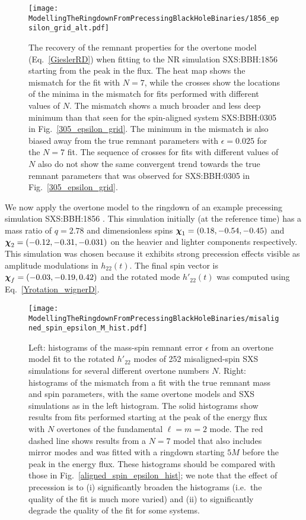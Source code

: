 \begin{figure}[t]
    \centering
    \texttt{[image: ModellingTheRingdownFromPrecessingBlackHoleBinaries/1856\_epsilon\_grid\_alt.pdf]}
    \caption[Recovery of the SXS:BBH:1856 remnant properties using an overtone model starting from the peak of the GW energy flux]{
    The recovery of the remnant properties for the overtone model (Eq.~\ref{GieslerRD}) when fitting to the NR simulation SXS:BBH:1856 starting from the peak in the flux.
    The heat map shows the mismatch for the fit with $N=7$, while the crosses show the locations of the minima in the mismatch for fits performed with different values of $N$.
    The mismatch shows a much broader and less deep minimum than that seen for the spin-aligned system SXS:BBH:0305 in Fig.~\ref{305_epsilon_grid}.
    The minimum in the mismatch is also biased away from the true remnant parameters with $\epsilon=0.025$ for the $N=7$ fit.
    The sequence of crosses for fits with different values of $N$ also do not show the same convergent trend towards the true remnant parameters that was observed for SXS:BBH:0305 in Fig.~\ref{305_epsilon_grid}.
	}
	\label{1856_epsilon_grid}
\end{figure}

We now apply the overtone model to the ringdown of an example precessing simulation SXS:BBH:1856 \cite{Varma:2019csw}. 
This simulation initially (at the reference time) has a mass ratio of $q=2.78$ and dimensionless spins $\vb*{\chi}_1=(0.18, -0.54, -0.45)$ and $\vb*{\chi}_2=(-0.12, -0.31, -0.031)$ on the heavier and lighter components respectively. This simulation was chosen because it exhibits strong precession effects visible as amplitude modulations in $h_{22}(t)$. The final spin vector is $\vb*{\chi}_f=(-0.03,-0.19,0.42)$ and the rotated mode $h'_{22}(t)$ was computed using Eq.~\ref{Yrotation_wignerD}.

\begin{figure*}[t]
    \centering
    \texttt{[image: ModellingTheRingdownFromPrecessingBlackHoleBinaries/misaligned\_spin\_epsilon\_M\_hist.pdf]}
    \caption[Remnant error and mismatches for fits to misaligned-spin SXS simulations using an overtone model]{Left: histograms of the mass-spin remnant error $\epsilon$ from an overtone model fit to the rotated $h'_{22}$ modes of 252 misaligned-spin SXS simulations for several different overtone numbers $N$. 
    Right: histograms of the mismatch from a fit with the true remnant mass and spin parameters, with the same overtone models and SXS simulations as in the left histogram.
    The solid histograms show results from fits performed starting at the peak of the energy flux with $N$ overtones of the fundamental $\ell = m = 2$ mode.
    The red dashed line shows results from a $N=7$ model that also includes mirror modes and was fitted with a ringdown starting $5M$ before the peak in the energy flux.
    These histograms should be compared with those in Fig.~\ref{aligned_spin_epsilon_hist}; we note that the effect of precession is to (i) significantly broaden the histograms (i.e.\ the quality of the fit is much more varied) and (ii) to significantly degrade the quality of the fit for some systems.}
    \label{misaligned_spin_epsilon_hist}
\end{figure*}

